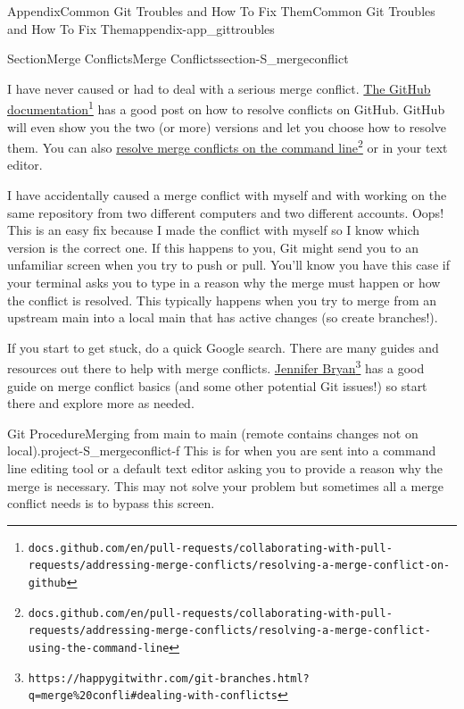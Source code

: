 \documentclass[twoside,10pt,]{book}
\begin{document}
\begin{appendixptx}{Appendix}{Common Git Troubles and How To Fix Them}{}{Common Git Troubles and How To Fix Them}{}{}{appendix-app_gittroubles}
\begin{sectionptx}{Section}{Merge Conflicts}{}{Merge Conflicts}{}{}{section-S_mergeconflict}
\par
I have never caused or had to deal with a serious merge conflict. \href{https://docs.github.com/en/pull-requests/collaborating-with-pull-requests/addressing-merge-conflicts/resolving-a-merge-conflict-on-github}{The GitHub documentation}\footnote{\nolinkurl{docs.github.com/en/pull-requests/collaborating-with-pull-requests/addressing-merge-conflicts/resolving-a-merge-conflict-on-github}\label{fn-S_mergeconflict-c-b}} has a good post on how to resolve conflicts on GitHub. GitHub will even show you the two (or more) versions and let you choose how to resolve them. You can also \href{https://docs.github.com/en/pull-requests/collaborating-with-pull-requests/addressing-merge-conflicts/resolving-a-merge-conflict-using-the-command-line}{resolve merge conflicts on the command line}\footnote{\nolinkurl{docs.github.com/en/pull-requests/collaborating-with-pull-requests/addressing-merge-conflicts/resolving-a-merge-conflict-using-the-command-line}\label{fn-S_mergeconflict-c-d}} or in your text editor.%
\par
I have accidentally caused a merge conflict with myself and with working on the same repository from two different computers and two different accounts. Oops! This is an easy fix because I made the conflict with myself so I know which version is the correct one. If this happens to you, Git might send you to an unfamiliar screen when you try to push or pull. You'll know you have this case if your terminal asks you to type in a reason why the merge must happen or how the conflict is resolved. This typically happens when you try to merge from an upstream main into a local main that has active changes (so create branches!).%
\par
If you start to get stuck, do a quick Google search. There are many guides and resources out there to help with merge conflicts. \href{https://happygitwithr.com/git-branches.html?q=merge\%20confli\#dealing-with-conflicts}{Jennifer Bryan}\footnote{\nolinkurl{https://happygitwithr.com/git-branches.html?q=merge\%20confli\#dealing-with-conflicts}\label{fn-S_mergeconflict-e-b}} has a good guide on merge conflict basics (and some other potential Git issues!) so start there and explore more as needed.%
\begin{project}{Git Procedure}{Merging from main to main (remote contains changes not on local).}{project-S_mergeconflict-f}%
This is for when you are sent into a command line editing tool or a default text editor asking you to provide a reason why the merge is necessary. This may not solve your problem but sometimes all a merge conflict needs is to bypass this screen.%

\end{project}
\end{sectionptx}
\end{appendixptx}
\end{document}
